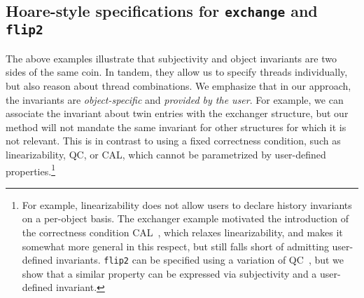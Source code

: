 \subsection{Hoare-style specifications for \texttt{exchange} and
  \texttt{flip2}}
\label{sec:hoare}

The above examples illustrate that subjectivity and object invariants
are two sides of the same coin. In tandem, they allow us to specify
threads individually, but also reason about thread combinations. We
emphasize that in our approach, the invariants are
\emph{object-specific} and \emph{provided by the user}. For example,
we can associate the invariant about twin entries with the exchanger
structure, but our method will not mandate the same invariant for
other structures for which it is not relevant. This is in contrast to
using a fixed correctness condition, such as linearizability, QC, or
CAL, which cannot be parametrized by user-defined
properties.\footnote{For example, linearizability does not allow users
  to declare history invariants on a per-object basis. The exchanger
  example motivated the introduction of the correctness condition
  CAL~\cite{Hemed-Rinetzky:PODC14}, which relaxes linearizability, and
  makes it somewhat more general in this respect, but still falls
  short of admitting user-defined invariants. \texttt{flip2} can be
  specified using a variation of QC~\cite{Jagadeesan-Riely:ICALP14},
  but we show that a similar property can be expressed via
  subjectivity and a user-defined invariant.}




